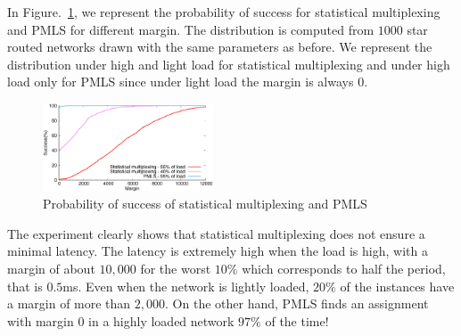 \documentclass[10pt, conference, letterpaper]{IEEEtran}
\begin{document}
     In Figure.~\ref{fig:sto}, we represent the probability of success for statistical multiplexing and PMLS for different margin. The distribution is computed from $1000$ star routed networks drawn with the same parameters as before. We represent the distribution under high and light load for statistical multiplexing and under high load only for PMLS since under light load the margin is always $0$. 
     

    \begin{figure}
       \begin{center}
      \includegraphics[width = 0.45\textwidth]{stochastic.eps}
      \end{center}
      \caption{Probability of success of statistical multiplexing and PMLS}
      \label{fig:sto}   
     \end{figure}    
 
     The experiment clearly shows that statistical multiplexing does not ensure a minimal latency. 
     The latency is extremely high when the load is high, with a margin of about $10,000$ for the worst $10\%$ which corresponds to half the period, that is $0.5$ms. Even when the network is lightly loaded, $20\%$ of the instances have a margin of more than $2,000$. On the other hand, PMLS finds an assignment with margin $0$ in a highly loaded network $97\%$ of the time! 
\end{document}
